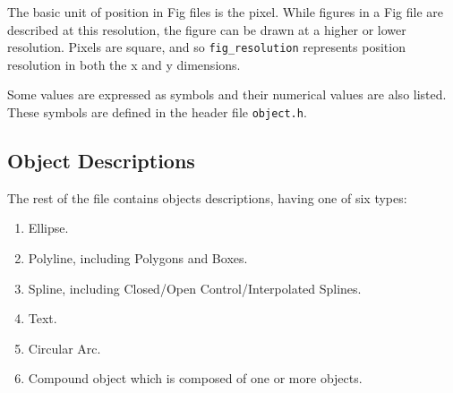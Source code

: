 The basic unit of position in Fig files is the pixel.
While figures in a Fig file are described at this resolution,
	the figure can be drawn at a higher or lower resolution.
Pixels are square, and so \verb|fig_resolution| represents position
	resolution in both the x and y dimensions.

Some values are expressed as symbols and their numerical values are also listed.
These symbols are defined in the header file {\tt object.h}.

\subsection{Object Descriptions}
The rest of the file contains objects descriptions,
	having one of six types:

\begin{enumerate}
\item Ellipse.
\item Polyline, including Polygons and Boxes.
\item Spline, including Closed/Open Control/Interpolated Splines.
\item Text.
\item Circular Arc.
\item Compound object which is composed of one or more objects.
\end{enumerate}

